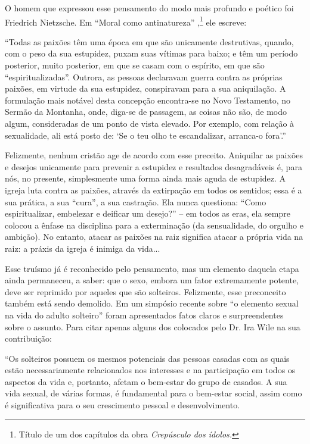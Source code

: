 O homem que expressou esse pensamento do modo mais profundo e poético
foi Friedrich Nietzsche. Em ``Moral como antinatureza'' ,\footnote{Título
  de um dos capítulos da obra \emph{Crepúsculo dos ídolos.}} ele
escreve:

``Todas as paixões têm uma época em que são unicamente destrutivas,
quando, com o peso da sua estupidez, puxam suas vítimas para baixo; e
têm um período posterior, muito posterior, em que se casam com o
espírito, em que são ``espiritualizadas''. Outrora, as pessoas
declaravam guerra contra as próprias paixões, em virtude da sua
estupidez, conspiravam para a sua aniquilação. A formulação mais notável
desta concepção encontra-se no Novo Testamento, no Sermão da Montanha,
onde, diga-se de passagem, as coisas não são, de modo algum,
consideradas de um ponto de vista elevado. Por exemplo, com relação à
sexualidade, ali está posto de: `Se o teu olho te escandalizar,
arranca-o fora'.''

Felizmente, nenhum cristão age de acordo com esse preceito. Aniquilar as
paixões e desejos unicamente para prevenir a estupidez e resultados
desagradáveis é, para nós, no presente, simplesmente uma forma ainda
mais aguda de estupidez. A igreja luta contra as paixões, através da
extirpação em todos os sentidos; essa é a sua prática, a sua ``cura'', a
sua castração. Ela nunca questiona: ``Como espiritualizar, embelezar e
deificar um desejo?'' -- em todos as eras, ela sempre colocou a ênfase
na disciplina para a exterminação (da sensualidade, do orgulho e
ambição). No entanto, atacar as paixões na raiz significa atacar a
própria vida na raiz: a práxis da igreja é inimiga da vida...

Esse truísmo já é reconhecido pelo pensamento, mas um elemento daquela
etapa ainda permaneceu, a saber: que o sexo, embora um fator
extremamente potente, deve ser reprimido por aqueles que são solteiros.
Felizmente, esse preconceito também está sendo demolido. Em um simpósio
recente sobre ``o elemento sexual na vida do adulto solteiro'' foram
apresentados fatos claros e surpreendentes sobre o assunto. Para citar
apenas alguns dos colocados pelo Dr. Ira Wile na sua contribuição:

``Os solteiros possuem os mesmos potenciais das pessoas casadas com as
quais estão necessariamente relacionados nos interesses e na
participação em todos os aspectos da vida e, portanto, afetam o
bem-estar do grupo de casados. A sua vida sexual, de várias formas, é
fundamental para o bem-estar social, assim como é significativa para o
seu crescimento pessoal e desenvolvimento.

